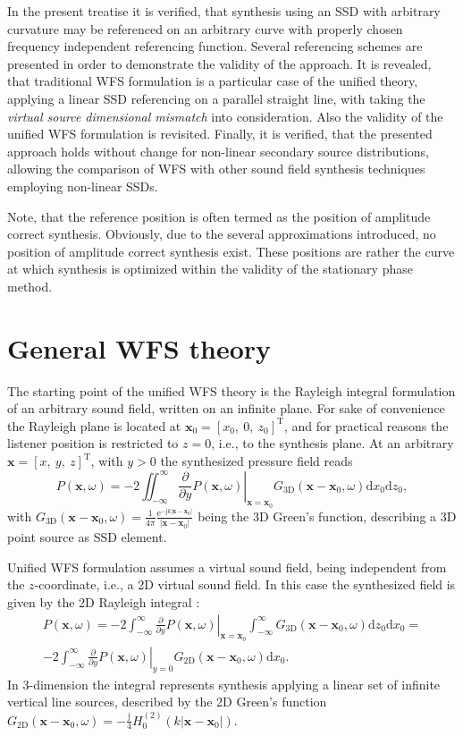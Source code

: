 \documentclass[12pt,a4paper]{article}
\newcommand{\td}{\mathrm{d}}
\newcommand{\te}{\mathrm{e}}
\newcommand{\ti}{\mathrm{j}}
\newcommand{\vx}{\mathbf{x}}
\newcommand{\vxo}{\mathbf{x}_0}
\begin{document}
In the present treatise it is verified, that synthesis using an SSD with arbitrary curvature may be referenced on an arbitrary curve with properly chosen frequency independent referencing function. Several referencing schemes are presented in order to demonstrate the validity of the approach. It is revealed, that traditional WFS formulation is a particular case of the unified theory, applying a linear SSD referencing on a parallel straight line, with taking the \emph{virtual source dimensional mismatch} into consideration.
Also the validity of the unified WFS formulation is revisited.
Finally, it is verified, that the presented approach holds without change for non-linear secondary source distributions, allowing the comparison of WFS with other sound field synthesis techniques employing non-linear SSDs.

Note, that the reference position is often termed as the position of amplitude correct synthesis. Obviously, due to the several approximations introduced, no position of amplitude correct synthesis exist. These positions are rather the curve at which synthesis is optimized within the validity of the stationary phase method.

\section{General WFS theory}
The starting point of the unified WFS theory is the Rayleigh integral formulation of an arbitrary sound field, written on an infinite plane. For sake of convenience the Rayleigh plane is located at $\vxo = [x_0,\ 0,\ z_0]^{\mathrm{T}}$, and for practical reasons the listener position is restricted to $z=0$, i.e., to the synthesis plane. At an arbitrary $\vx = [x,\ y,\ z]^{\mathrm{T}}$, with $y>0$ the synthesized pressure field reads
\begin{equation}
P(\vx,\omega) = -2 \iint_{-\infty}^{\infty} \left. \frac{\partial}{\partial y} P(\vx,\omega) \right|_{\vx = \vxo} G_{3\mathrm{D}}(\vx - \vxo,\omega) \td x_0 \td z_0,
\label{Eq:Theory:3D_Rayleigh}
\end{equation}
with $G_{3\mathrm{D}}(\vx - \vxo,\omega) = \frac{1}{4\pi} \frac{\te^{-\ti k |\vx-\vxo| }}{|\vx-\vxo|}$ being the 3D Green's function, describing a 3D point source as SSD element.

% 
Unified WFS formulation assumes a virtual sound field, being independent from the $z$-coordinate, i.e., a 2D virtual sound field. In this case the synthesized field is given by the 2D Rayleigh integral \cite{Spors2008:WFSrevisited}:
\begin{multline}
P(\vx,\omega) = -2 \int_{-\infty}^{\infty} \left. \frac{\partial}{\partial y} P(\vx,\omega) \right|_{\vx=\vxo} 
\int_{-\infty}^{\infty} G_{3\mathrm{D}}(\vx - \vxo,\omega) \td z_0 \td x_0 = \\
-2 \int_{-\infty}^{\infty} \left. \frac{\partial}{\partial y} P(\vx,\omega) \right|_{y = 0} G_{2\mathrm{D}}(\vx - \vxo,\omega) \td x_0.
\label{Eq:2D_Rayleigh}
\end{multline}
In 3-dimension the integral represents synthesis applying a linear set of infinite vertical line sources, described by the 2D Green's function $G_{2\mathrm{D}}(\vx - \vxo,\omega) = -\frac{\ti}{4} H_0^{(2)}\left( k |\vx-\vxo| \right)$.
\end{document}
